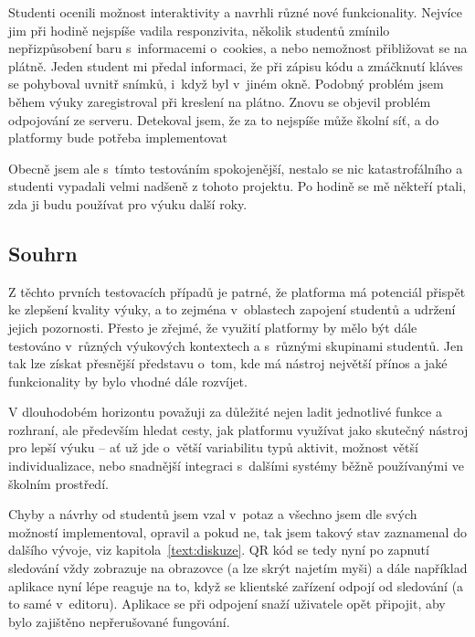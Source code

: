 Studenti ocenili možnost interaktivity a navrhli různé nové funkcionality.
Nejvíce jim při hodině nejspíše vadila responzivita, několik studentů zmínilo nepřizpůsobení baru s~informacemi o~cookies, a nebo nemožnost přibližovat se na plátně.
Jeden student mi předal informaci, že při zápisu kódu a zmáčknutí kláves se pohyboval uvnitř snímků, i~když byl v~jiném okně.
Podobný problém jsem během výuky zaregistroval při kreslení na plátno.
Znovu se objevil problém odpojování ze serveru.
Detekoval jsem, že za to nejspíše může školní síť, a do platformy bude potřeba implementovat 

Obecně jsem ale s~tímto testováním spokojenější, nestalo se nic katastrofálního a studenti vypadali velmi nadšeně z tohoto projektu.
Po hodině se mě někteří ptali, zda ji budu používat pro výuku další roky.

\subsection{Souhrn}

Z těchto prvních testovacích případů je patrné, že platforma má potenciál přispět ke zlepšení kvality výuky, a to zejména v~oblastech zapojení studentů a udržení jejich pozornosti. 
Přesto je zřejmé, že využití platformy by mělo být dále testováno v~různých výukových kontextech a s~různými skupinami studentů. 
Jen tak lze získat přesnější představu o~tom, kde má nástroj největší přínos a jaké funkcionality by bylo vhodné dále rozvíjet.

V dlouhodobém horizontu považuji za důležité nejen ladit jednotlivé funkce a rozhraní, ale především hledat cesty, jak platformu využívat jako skutečný nástroj pro lepší výuku -- ať už jde o~větší variabilitu typů aktivit, možnost větší individualizace, nebo snadnější integraci s~dalšími systémy běžně používanými ve školním prostředí.

Chyby a návrhy od studentů jsem vzal v~potaz a všechno jsem dle svých možností implementoval, opravil a pokud ne, tak jsem takový stav zaznamenal do dalšího vývoje, viz kapitola~\ref{text:diskuze}.
QR kód se tedy nyní po zapnutí sledování vždy zobrazuje na obrazovce (a lze skrýt najetím myši) a dále například aplikace nyní lépe reaguje na to, když se klientské zařízení odpojí od sledování (a to samé v~editoru).
Aplikace se při odpojení snaží uživatele opět připojit, aby bylo zajištěno nepřerušované fungování.